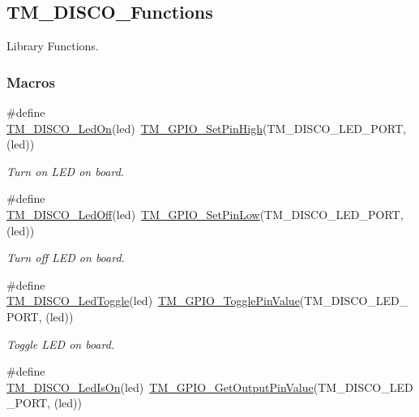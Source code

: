 \hypertarget{group___t_m___d_i_s_c_o___functions}{}\subsection{T\+M\+\_\+\+D\+I\+S\+C\+O\+\_\+\+Functions}
\label{group___t_m___d_i_s_c_o___functions}


Library Functions.  


\subsubsection*{Macros}
\begin{DoxyCompactItemize}
\item 
\#define \hyperlink{group___t_m___d_i_s_c_o___functions_ga72aa66c1c0647cf3bbb3c2c069f1901a}{T\+M\+\_\+\+D\+I\+S\+C\+O\+\_\+\+Led\+On}(led)~\hyperlink{group___t_m___g_p_i_o___functions_gac5aa8fbc39ed67f47972097fb7c8d69d}{T\+M\+\_\+\+G\+P\+I\+O\+\_\+\+Set\+Pin\+High}(T\+M\+\_\+\+D\+I\+S\+C\+O\+\_\+\+L\+E\+D\+\_\+\+P\+O\+R\+T, (led))
\begin{DoxyCompactList}\small\item\em Turn on L\+E\+D on board. \end{DoxyCompactList}\item 
\#define \hyperlink{group___t_m___d_i_s_c_o___functions_gab295e2ecb3dc81210a9af3f5281cae79}{T\+M\+\_\+\+D\+I\+S\+C\+O\+\_\+\+Led\+Off}(led)~\hyperlink{group___t_m___g_p_i_o___functions_gaccceda87ce348c73b43780fdfed048d3}{T\+M\+\_\+\+G\+P\+I\+O\+\_\+\+Set\+Pin\+Low}(T\+M\+\_\+\+D\+I\+S\+C\+O\+\_\+\+L\+E\+D\+\_\+\+P\+O\+R\+T, (led))
\begin{DoxyCompactList}\small\item\em Turn off L\+E\+D on board. \end{DoxyCompactList}\item 
\#define \hyperlink{group___t_m___d_i_s_c_o___functions_gaacaee2ef25adf5ff2cc2be660b561d94}{T\+M\+\_\+\+D\+I\+S\+C\+O\+\_\+\+Led\+Toggle}(led)~\hyperlink{group___t_m___g_p_i_o___functions_ga92ef176c8195c54b326b3c7526b878b2}{T\+M\+\_\+\+G\+P\+I\+O\+\_\+\+Toggle\+Pin\+Value}(T\+M\+\_\+\+D\+I\+S\+C\+O\+\_\+\+L\+E\+D\+\_\+\+P\+O\+R\+T, (led))
\begin{DoxyCompactList}\small\item\em Toggle L\+E\+D on board. \end{DoxyCompactList}\item 
\#define \hyperlink{group___t_m___d_i_s_c_o___functions_ga88ebf703816bec3e79e60fef9c469950}{T\+M\+\_\+\+D\+I\+S\+C\+O\+\_\+\+Led\+Is\+On}(led)~\hyperlink{group___t_m___g_p_i_o___functions_ga6402ec4503fa0f3380d3bdbb1d9510db}{T\+M\+\_\+\+G\+P\+I\+O\+\_\+\+Get\+Output\+Pin\+Value}(T\+M\+\_\+\+D\+I\+S\+C\+O\+\_\+\+L\+E\+D\+\_\+\+P\+O\+R\+T, (led))

\end{DoxyCompactItemize}
